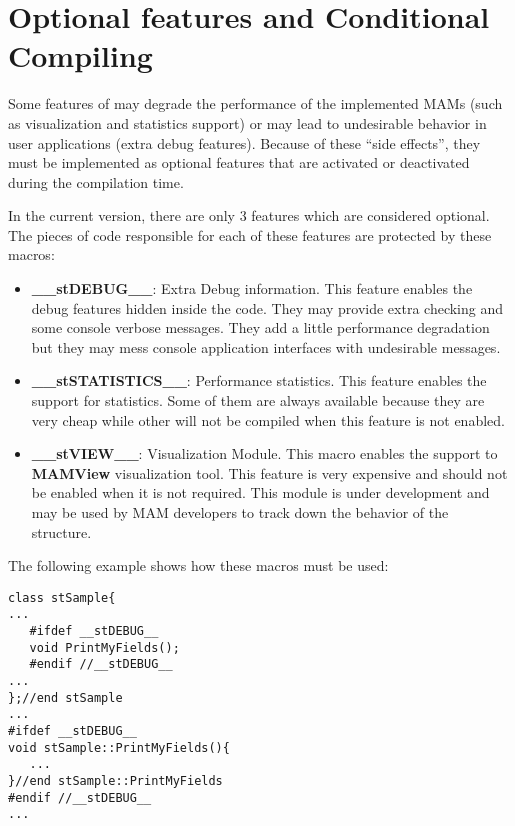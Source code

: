 \section{Optional features and Conditional Compiling}
\label{sec:coding.options}

Some features of \libname{ }may degrade the performance of the implemented MAMs (such as visualization and statistics support) or may lead to undesirable behavior in user applications (extra debug features). Because of these ``side effects'', they must be implemented as optional features that are activated or deactivated during the compilation time.

In the current version, there are only 3 features which are considered optional. The pieces of code responsible for each of these features are protected by these macros:

\begin{itemize}
	\item {\bf \_\_stDEBUG\_\_}: Extra Debug information. This feature enables the debug features hidden inside the code. They may provide extra checking and some console verbose messages. They add a little performance degradation but they may mess console application interfaces with undesirable messages.
	\item {\bf \_\_stSTATISTICS\_\_}: Performance statistics. This feature enables the support for statistics. Some of them are always available because they are very cheap while other will not be compiled when this feature is not enabled.
	\item {\bf \_\_stVIEW\_\_}: Visualization Module. This macro enables the support to {\bf MAMView} visualization  tool. This feature is very expensive and should not be enabled when it is not required. This module is under development and may be used by MAM developers to track down the behavior of the structure.
\end{itemize}

The following example shows how these macros must be used:

\begin{code}
\begin{verbatim}
class stSample{
...
   #ifdef __stDEBUG__
   void PrintMyFields();
   #endif //__stDEBUG__
...
};//end stSample
...
#ifdef __stDEBUG__
void stSample::PrintMyFields(){
   ...
}//end stSample::PrintMyFields
#endif //__stDEBUG__
...
\end{verbatim}
\end{code}

